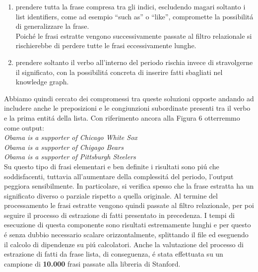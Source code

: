 \documentclass[twocolumn,10pt]{asme2ej}
\begin{document}
\begin{enumerate}
\item prendere tutta la frase compresa tra gli indici, escludendo magari soltanto i list identifiers, come ad esempio ``such as'' o ``like'', compromette la possibilit\'a di generalizzare la frase. \\Poich\'e le frasi estratte vengono successivamente passate al filtro relazionale si rischierebbe di perdere tutte le frasi eccessivamente lunghe.
\item prendere soltanto il verbo all'interno del periodo rischia invece di stravolgerne il significato, con la possibilit\'a concreta di inserire fatti sbagliati nel knowledge graph.
\end{enumerate}
Abbiamo quindi cercato dei compromessi tra queste soluzioni opposte andando ad includere anche le preposizioni e le congiunzioni subordinate presenti tra il verbo e la  prima entit\'a della lista. Con riferimento ancora alla Figura 6 otterremmo come output: \textit{\\ 
 Obama is a supporter of Chicago White Sox\\
 Obama is a supporter of Chigago Bears\\ 
 Obama is a supporter of Pittsburgh Steelers}\\
Su questo tipo di frasi elementari e ben definite i risultati sono pi\'u che soddisfacenti, tuttavia all'aumentare della complessit\'a del periodo, l'output peggiora sensibilmente. In particolare, si verifica spesso che la frase estratta ha un significato diverso o parziale rispetto a quella originale. Al termine del processamento le frasi estratte vengono quindi passate al filtro relazionale, per poi seguire il processo di estrazione di fatti presentato in precedenza.
I tempi di esecuzione di questa componente sono risultati estremamente lunghi e per questo \'e senza dubbio necessario scalare orizzontalmente, splittando il file ed eseguendo il calcolo di dipendenze su pi\'u calcolatori. Anche la valutazione del processo di estrazione di fatti da frase lista, di conseguenza, \'e stata effettuata su un campione di \textbf{10.000} frasi passate alla libreria di Stanford.
\end{document}
